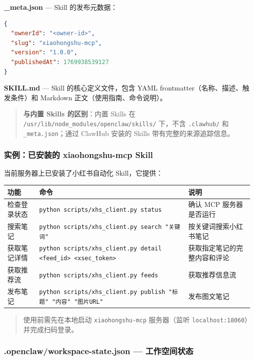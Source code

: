 \textbf{\_meta.json} --- Skill 的发布元数据：

\begin{lstlisting}[language=json]
{
  "ownerId": "<owner-id>",
  "slug": "xiaohongshu-mcp",
  "version": "1.0.0",
  "publishedAt": 1769938539127
}
\end{lstlisting}

\textbf{SKILL.md} --- Skill 的核心定义文件，包含 YAML frontmatter（名称、描述、触发条件）和 Markdown 正文（使用指南、命令说明）。

\begin{quote}
\textbf{与内置 Skills 的区别}：内置 Skills 在 \texttt{/usr/lib/node\_modules/openclaw/skills/} 下，不含 \texttt{.clawhub/} 和 \texttt{\_meta.json}；通过 ClawHub 安装的 Skills 带有完整的来源追踪信息。
\end{quote}

\subsubsection{实例：已安装的 xiaohongshu-mcp Skill}


当前服务器上已安装了小红书自动化 Skill，它提供：

\begin{table}[h]
\centering
\small
\begin{tabular}{|l|l|l|}
\hline
功能 & 命令 & 说明 \\
\hline
检查登录状态 & \texttt{python scripts/xhs\_client.py status} & 确认 MCP 服务器是否运行 \\
\hline
搜索笔记 & \texttt{python scripts/xhs\_client.py search "关键词"} & 按关键词搜索小红书笔记 \\
\hline
获取笔记详情 & \texttt{python scripts/xhs\_client.py detail <feed\_id> <xsec\_token>} & 获取指定笔记的完整内容和评论 \\
\hline
获取推荐流 & \texttt{python scripts/xhs\_client.py feeds} & 获取推荐信息流 \\
\hline
发布笔记 & \texttt{python scripts/xhs\_client.py publish "标题" "内容" "图片URL"} & 发布图文笔记 \\
\hline
\end{tabular}
\end{table}

\begin{quote}
使用前需先在本地启动 \texttt{xiaohongshu-mcp} 服务器（监听 \texttt{localhost:18060}）并完成扫码登录。
\end{quote}

\subsubsection{.openclaw/workspace-state.json --- 工作空间状态}


